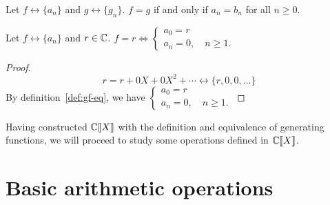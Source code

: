 \documentclass[a4paper, 12pt]{report}
\begin{document}
\begin{defn}\label{def:gf-eq}
Let $f \longleftrightarrow \{a_n\}$ and $g \longleftrightarrow \{g_n\}$. $f = g$ if and only if $a_n = b_n$ for all $n \geq 0$.
\end{defn}

\begin{lem}\label{lem:gf-id-r}
Let $f \longleftrightarrow \{a_n\}$ and $r \in \mathbb{C}$. $f = r \iff \begin{cases}
    a_0 = r\\
    a_n = 0, \quad n \geq 1.
\end{cases}$
\end{lem}
\begin{proof}\label{proof:gf-id-r}
\[r = r + 0X + 0X^2 + \cdots \longleftrightarrow \{r, 0, 0, \dots\}\]
By definition~\ref{def:gf-eq}, we have $\begin{cases}
a_0 = r\\
a_n = 0, \quad n \geq 1.
\end{cases}$
\end{proof}

Having constructed $\mathbb{C}\llbracket X \rrbracket$ with the definition and equivalence of generating functions, we will proceed to study some operations defined in $\mathbb{C}\llbracket X \rrbracket$.

\section{Basic arithmetic operations}
\end{document}
